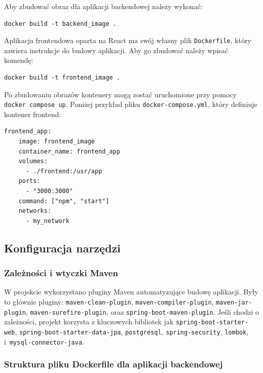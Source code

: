 Aby zbudować obraz dla aplikacji backendowej należy wykonać:
\begin{lstlisting}[basicstyle=\footnotesize\ttfamily]
docker build -t backend_image .
\end{lstlisting}

Aplikacja frontendowa oparta na React ma swój własny plik \texttt{Dockerfile}, który zawiera instrukcje do budowy aplikacji. Aby go zbudować należy wpisać komendę:
\begin{lstlisting}[basicstyle=\footnotesize\ttfamily]
docker build -t frontend_image .
\end{lstlisting}


Po zbudowaniu obrazów kontenery mogą zostać uruchomione przy pomocy \texttt{docker compose up}. Poniżej przykład pliku \texttt{docker-compose.yml}, który definiuje kontener frontend:
\begin{lstlisting}[basicstyle=\footnotesize\ttfamily]
  frontend_app:
    image: frontend_image
    container_name: frontend_app
    volumes:
      - ./frontend:/usr/app
    ports:
      - "3000:3000"
    command: ["npm", "start"]
    networks:
      - my_network
\end{lstlisting}

\subsection{Konfiguracja narzędzi} 

\subsubsection{Zależności i wtyczki Maven}
W projekcie wykorzystano pluginy Maven automatyzujące budowę aplikacji. Były to głównie pluginy: \texttt{maven-clean-plugin}, \texttt{maven-compiler-plugin}, \texttt{maven-jar-plugin}, \texttt{maven-surefire-plugin}, oraz \texttt{spring-boot-maven-plugin}.
Jeśli chodzi o zależności, projekt korzysta z kluczowych bibliotek jak \texttt{spring-boot-starter-web}, \texttt{spring-boot-starter-data-jpa}, \texttt{postgresql}, \texttt{spring-security}, \texttt{lombok}, i~\texttt{mysql-connector-java}.

\subsubsection{Struktura pliku Dockerfile dla aplikacji backendowej}

